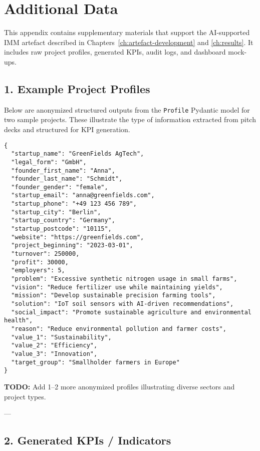 
\chapter{Additional Data}\label{ch:additional-data}

This appendix contains supplementary materials that support the AI-supported IMM artefact described in Chapters~\ref{ch:artefact-development} and \ref{ch:results}. 
It includes raw project profiles, generated KPIs, audit logs, and dashboard mock-ups.

\section*{1. Example Project Profiles}

Below are anonymized structured outputs from the \texttt{Profile} Pydantic model for two sample projects. 
These illustrate the type of information extracted from pitch decks and structured for KPI generation.

\begin{verbatim}
{
  "startup_name": "GreenFields AgTech",
  "legal_form": "GmbH",
  "founder_first_name": "Anna",
  "founder_last_name": "Schmidt",
  "founder_gender": "female",
  "startup_email": "anna@greenfields.com",
  "startup_phone": "+49 123 456 789",
  "startup_city": "Berlin",
  "startup_country": "Germany",
  "startup_postcode": "10115",
  "website": "https://greenfields.com",
  "project_beginning": "2023-03-01",
  "turnover": 250000,
  "profit": 30000,
  "employers": 5,
  "problem": "Excessive synthetic nitrogen usage in small farms",
  "vision": "Reduce fertilizer use while maintaining yields",
  "mission": "Develop sustainable precision farming tools",
  "solution": "IoT soil sensors with AI-driven recommendations",
  "social_impact": "Promote sustainable agriculture and environmental health",
  "reason": "Reduce environmental pollution and farmer costs",
  "value_1": "Sustainability",
  "value_2": "Efficiency",
  "value_3": "Innovation",
  "target_group": "Smallholder farmers in Europe"
}
\end{verbatim}

\textbf{TODO:} Add 1–2 more anonymized profiles illustrating diverse sectors and project types.

---

\section*{2. Generated KPIs / Indicators}

